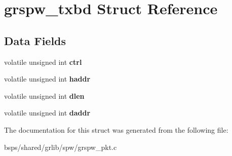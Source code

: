 \hypertarget{structgrspw__txbd}{}\section{grspw\+\_\+txbd Struct Reference}
\label{structgrspw__txbd}
\subsection*{Data Fields}
\begin{DoxyCompactItemize}
\item 
\mbox{\label{structgrspw__txbd_af4bf2601991e36eb13b9a84fd6ee8bb5}} 
volatile unsigned int {\bfseries ctrl}
\item 
\mbox{\label{structgrspw__txbd_a4464105403b5a8836d89810e94f4d4d5}} 
volatile unsigned int {\bfseries haddr}
\item 
\mbox{\label{structgrspw__txbd_a555661a5076afd534e70cf724db90767}} 
volatile unsigned int {\bfseries dlen}
\item 
\mbox{\label{structgrspw__txbd_a14ba6cd34dccc6791729bbea06902cad}} 
volatile unsigned int {\bfseries daddr}
\end{DoxyCompactItemize}


The documentation for this struct was generated from the following file\+:\begin{DoxyCompactItemize}
\item 
bsps/shared/grlib/spw/grspw\+\_\+pkt.\+c\end{DoxyCompactItemize}
